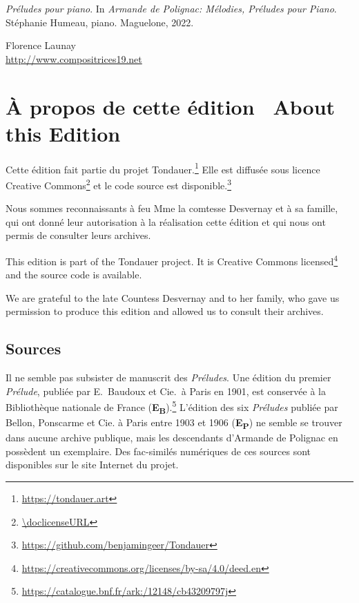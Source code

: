 \documentclass[a4paper, 12pt]{book}
\newcommand{\source}[2]{\textbf{#1\textsubscript{#2}}}
\newcommand{\bigdot}[0]{{\Large \textbullet}}
\newcommand{\centerbigdot}[0]{\begin{center}\bigdot\end{center}}
\begin{document}
\begin{otherlanguage}{english}
\begin{hangparas}{.5cm}{1}
  \emph{Préludes pour piano}. In \emph{Armande de Polignac: Mélodies, Préludes pour Piano}.
  Stéphanie Humeau, piano. Maguelone, 2022.

\end{hangparas}

\vspace{\baselineskip}

\hfill
\begin{minipage}[t]{0.55\textwidth}
  Florence Launay \\
  {\small \url{http://www.compositrices19.net}}
\end{minipage}

\end{otherlanguage}

\chapter*{À propos de cette édition
  \bigdot\ \foreignlanguage{english}{About this Edition}}

Cette édition fait partie du projet
Tondauer.\footnote{\url{https://tondauer.art}\label{project}} Elle est
diffusée sous licence Creative Commons\footnote{\url{\doclicenseURL}}
et le code source est
disponible.\footnote{\url{https://github.com/benjamingeer/Tondauer}\label{source-code}}

Nous sommes reconnaissants à feu Mme la comtesse Desvernay et à sa famille,
qui ont donné leur autorisation à la réalisation cette édition et qui nous ont permis
de consulter leurs archives.

\centerbigdot

\begin{otherlanguage}{english}
  This edition is part of the Tondauer project. It is
  Creative Commons
  licensed\footnote{\url{https://creativecommons.org/licenses/by-sa/4.0/deed.en}}
  and the source code is available.

  We are grateful to the late Countess Desvernay and to her family, who gave us
  permission to produce this edition and allowed us to consult their archives.
\end{otherlanguage}
    
\section*{Sources}
  Il ne semble pas subsister de manuscrit des \emph{Préludes}. Une édition du
  premier \emph{Prélude}, publiée par E.\ Baudoux et Cie.\ à Paris en 1901,
  est conservée à la Bibliothèque nationale de France
  (\source{E}{B}).\footnote{\url{https://catalogue.bnf.fr/ark:/12148/cb43209797j}\label{BnF}}
  L'édition des six \emph{Préludes} publiée par Bellon, Ponscarme et Cie. à
  Paris entre 1903 et 1906 (\source{E}{P}) ne semble se trouver dans
  aucune archive publique, mais les descendants d'Armande de Polignac
  en possèdent un exemplaire. Des fac-similés numériques de ces
  sources sont disponibles sur le site Internet du
  projet.
  
\end{document}
